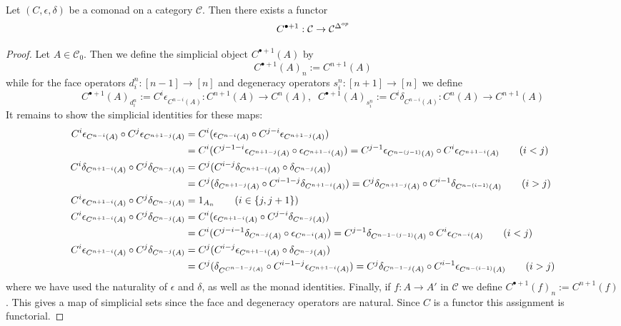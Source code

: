 \begin{prop}[label=prop:comonadSimp]
    Let $(C,\epsilon,\delta)$ be a comonad on a category $\mathcal{C}$. Then there exists a functor
    \begin{equation*}
        C^{\bullet+1}:\mathcal{C}\to \mathcal{C}^{\Delta^{op}}
    \end{equation*}
\end{prop}
\begin{proof}
    Let $A \in \mathcal{C}_0$. Then we define the simplicial object $C^{\bullet+1}(A)$ by 
    \begin{equation*}
        C^{\bullet+1}(A)_n := C^{n+1}(A)
    \end{equation*}
    while for the face operators $d_i^n:[n-1]\to [n]$ and degeneracy operators $s_i^n:[n+1]\to [n]$ we define 
    \begin{equation*}
        C^{\bullet+1}(A)_{d_i^n} := C^i\epsilon_{C^{n-i}(A)}:C^{n+1}(A)\to C^n(A),\;\; C^{\bullet+1}(A)_{s_i^n} := C^i\delta_{C^{n-i}(A)}:C^n(A)\to C^{n+1}(A)
    \end{equation*}
    It remains to show the simplicial identities for these maps:
    \begin{align*}
        C^i\epsilon_{C^{n-i}(A)}\circ C^j\epsilon_{C^{n+1-j}(A)} &= C^i(\epsilon_{C^{n-i}(A)}\circ C^{j-i}\epsilon_{C^{n+1-j}(A)}) \\
        &= C^i(C^{j-1-i}\epsilon_{C^{n+1-j}(A)}\circ \epsilon_{C^{n+1-i}(A)}) = C^{j-1}\epsilon_{C^{n-(j-1)}(A)}\circ C^{i}\epsilon_{C^{n+1-i}(A)} \tag{$i < j$} \\
        C^i\delta_{C^{n+1-i}(A)}\circ C^j\delta_{C^{n-j}(A)} &= C^j(C^{i-j}\delta_{C^{n+1-i}(A)}\circ \delta_{C^{n-j}(A)}) \\
        &= C^j(\delta_{C^{n+1-j}(A)}\circ C^{i-1-j}\delta_{C^{n+1-i}(A)}) = C^j\delta_{C^{n+1-j}(A)}\circ C^{i-1}\delta_{C^{n-(i-1)}(A)} \tag{$i > j$} \\
        C^i\epsilon_{C^{n+1-i}(A)}\circ C^j\delta_{C^{n-j}(A)} &= 1_{A_n} \tag{$i \in \{j,j+1\}$} \\
        C^i\epsilon_{C^{n+1-i}(A)}\circ C^j\delta_{C^{n-j}(A)} &= C^i(\epsilon_{C^{n+1-i}(A)}\circ C^{j-i}\delta_{C^{n-j}(A)}) \\
        &= C^i(C^{j-i-1}\delta_{C^{n-j}(A)}\circ \epsilon_{C^{n-i}(A)}) = C^{j-1}\delta_{C^{n-1-(j-1)}(A)}\circ C^i\epsilon_{C^{n-i}(A)} \tag{$i < j$} \\
        C^i\epsilon_{C^{n+1-i}(A)}\circ C^j\delta_{C^{n-j}(A)} &= C^j(C^{i-j}\epsilon_{C^{n+1-i}(A)}\circ \delta_{C^{n-j}(A)}) \\
        &= C^j(\delta_{C^{C^{n-1-j}(A)}}\circ C^{i-1-j}\epsilon_{C^{n+1-i}(A)}) = C^{j}\delta_{C^{n-1-j}(A)}\circ C^{i-1}\epsilon_{C^{n-(i-1)}(A)} \tag{$i > j$}
    \end{align*}
    where we have used the naturality of $\epsilon$ and $\delta$, as well as the monad identities. Finally, if $f:A\to A'$ in $\mathcal{C}$ we define $C^{\bullet+1}(f)_n := C^{n+1}(f)$. This gives a map of simplicial sets since the face and degeneracy operators are natural. Since $C$ is a functor this assignment is functorial.
\end{proof}


